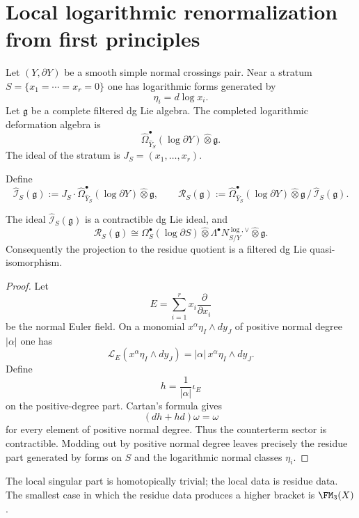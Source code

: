 \section{Local logarithmic renormalization from first principles}

Let $(Y,\partial Y)$ be a smooth simple normal crossings pair. Near a stratum
\(S=\{x_1=\cdots=x_r=0\}\) one has logarithmic forms generated by
\[
\eta_i = d\log x_i.
\]
Let $\mathfrak g$ be a complete filtered dg Lie algebra. The completed
logarithmic deformation algebra is
\[
\widehat\Omega^\bullet_{\widehat Y_S}(\log \partial Y)\widehat\otimes \mathfrak g.
\]
The ideal of the stratum is $J_S=(x_1,\dots,x_r)$.

\begin{definition}
Define
\[
\widehat{\mathcal I}_S(\mathfrak g)
:=
J_S\cdot \widehat\Omega^\bullet_{\widehat Y_S}(\log \partial Y)\widehat\otimes \mathfrak g,
\qquad
\mathcal R_S(\mathfrak g)
:=
\widehat\Omega^\bullet_{\widehat Y_S}(\log \partial Y)\widehat\otimes \mathfrak g\,/\,\widehat{\mathcal I}_S(\mathfrak g).
\]
\end{definition}

\begin{theorem}
\label{thm:local-residue-splitting-synthesis}
The ideal $\widehat{\mathcal I}_S(\mathfrak g)$ is a contractible dg Lie ideal, and
\[
\mathcal R_S(\mathfrak g)
\cong
\Omega^\bullet_S(\log \partial S)\widehat\otimes
\Lambda^\bullet N^{\log,\vee}_{S/Y}\widehat\otimes \mathfrak g.
\]
Consequently the projection to the residue quotient is a filtered dg Lie
quasi-isomorphism.
\end{theorem}

\begin{proof}
Let
\[
E=\sum_{i=1}^r x_i\frac{\partial}{\partial x_i}
\]
be the normal Euler field. On a monomial $x^\alpha\eta_I\wedge dy_J$ of positive
normal degree $|\alpha|$ one has
\[
\mathcal L_E(x^\alpha\eta_I\wedge dy_J)=|\alpha|\,x^\alpha\eta_I\wedge dy_J.
\]
Define
\[
h = \frac1{|\alpha|}\iota_E
\]
on the positive-degree part. Cartan's formula gives
\[
(dh+hd)\omega = \omega
\]
for every element of positive normal degree. Thus the counterterm sector is
contractible. Modding out by positive normal degree leaves precisely the residue
part generated by forms on $S$ and the logarithmic normal classes $\eta_i$.
\end{proof}

The local singular part is homotopically trivial; the local data is residue
data. The smallest case in which the residue data produces a higher bracket is
$\FM_3(X)$.

